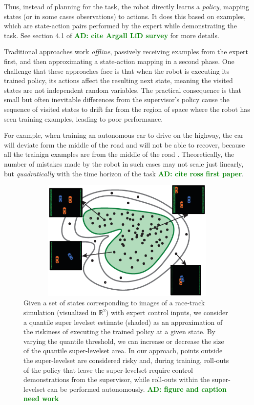 \documentclass[10pt, conference]{ieeeconf}      %
\newcommand{\adnote}[1]{\ifthenelse{\boolean{include-notes}}%
 {\textcolor{green}{\textbf{AD: #1}}}{}}
\begin{document}
Thus, instead of planning for the task, the robot directly learns a \emph{policy}, mapping states (or in some cases observations) to actions. It does this based on examples, which are state-action pairs performed by the expert while demonstrating the task. See section 4.1 of \cite{} \adnote{cite Argall LfD survey} for more details.

Traditional approaches work \emph{offline}, passively receiving examples from the expert first, and then approximating a state-action mapping in a second phase. One challenge that these approaches face is that when the robot is executing its trained policy, its actions affect the resulting next state, meaning the visited states are not independent random variables. The practical consequence is that small but often inevitable differences from the supervisor's policy cause the sequence of visited states to drift far from the region of space where the robot has seen training examples, leading to poor performance. 

For example, when training an autonomous car to drive on the highway, the car will deviate form the middle of the road and will not be able to recover, because all the trainign examples are from the middle of the road \cite{pomerleau1989alvinn}. Theoretically, the number of mistakes made by the robot in such cases may not scale just linearly, but \emph{quadratically} with the time horizon of the task \cite{} \adnote{cite ross first paper}.

\begin{figure}[t!]
\centering
\includegraphics[width=12cm, height=6cm]{figures/teaser.eps}
\caption{ 
Given a set of states corresponding to images of a race-track simulation (visualized in $\mathbb{R}^2$) with expert
control inputs, we consider a quantile super levelset estimate (shaded) as an approximation of the riskiness of
executing the trained policy at a given state. By varying the quantile threshold, we can increase or decrease the size
of the quantile super-levelset area. In our approach, points outside the super-levelset are considered risky and, during
training, roll-outs of the policy that leave the super-levelset require control demonstrations from the supervisor,
while roll-outs within the super-levelset can be performed autonomously. \adnote{figure and caption need work}
}
\vspace*{-10pt}
\label{fig:dis_traveled}
\end{figure}
\end{document}
